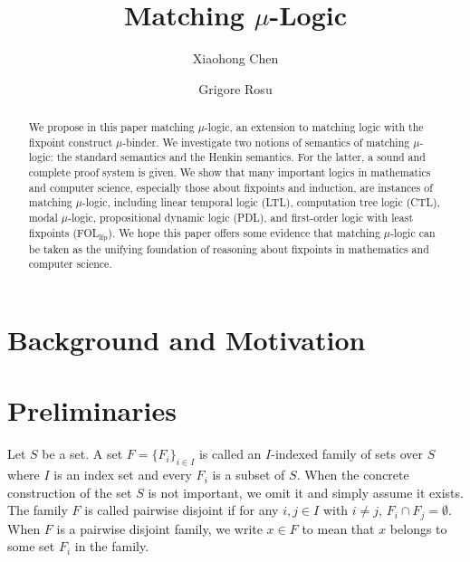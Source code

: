 \documentclass{amsart}
\title{Matching $\mu$-Logic}
\author{Xiaohong Chen}
\author{Grigore Rosu}
\begin{document}
	
\begin{abstract}
We propose in this paper matching $\mu$-logic, 
an extension to matching logic with the fixpoint construct $\mu$-binder.
We investigate two notions of semantics of matching $\mu$-logic:
the standard semantics and the Henkin semantics. 
For the latter, a sound and complete proof system is given.
We show that many important logics in mathematics and computer science,
especially those about fixpoints and induction, are instances
of matching $\mu$-logic, including
linear temporal logic (LTL),
computation tree logic (CTL),
modal $\mu$-logic,
propositional dynamic logic (PDL),
and first-order logic with least fixpoints (FOL$_\mathrm{lfp}$).
We hope this paper offers some evidence that matching $\mu$-logic
can be taken as the unifying foundation of reasoning about fixpoints
in mathematics and computer science.
\end{abstract}

\maketitle

\tableofcontents


\section{Background and Motivation}

\section{Preliminaries}

\begin{definition}
Let $S$ be a set. 
A set $F = \{F_i\}_{i \in I}$ is called an $I$-indexed family of sets
over $S$
where $I$ is an index set and every $F_i $ is a subset of $S$.
When the concrete construction of the set $S$ is not important,
we omit it and simply assume it exists.
The family $F$ is called pairwise disjoint if
for any $i, j \in I$ with $i \neq j$, 
$F_i \cap F_j = \emptyset$.
When $F$ is a pairwise disjoint family,
we write $x \in F$ to mean that $x$ belongs to some set $F_i$ in the family. 
\end{definition}
\end{document}
